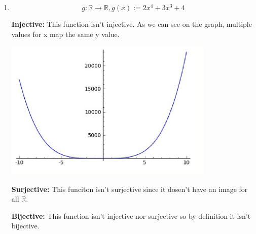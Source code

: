 \documentclass{article}
\begin{document}
\begin{enumerate}
{  {\bf Bijective: } This function is surjective and injective therefore is bijective.
  }

  \item{

    \[
    g: \mathbb{R} \rightarrow \mathbb{R},g(x):=2x^4 + 3x^3 + 4
    \]

    {\bf Injective: }This function isn't injective. As we can see on the graph, multiple values for x map the same y value.

    \includegraphics[width=100mm]{graph2.eps}

    {\bf Surjective: }This funciton isn't surjective since it dosen't have an image for all $\mathbb{R}$.

    {\bf Bijective: }This function isn't injective nor surjective so by definition it isn't bijective.

    }

\end{enumerate}
\end{document}
